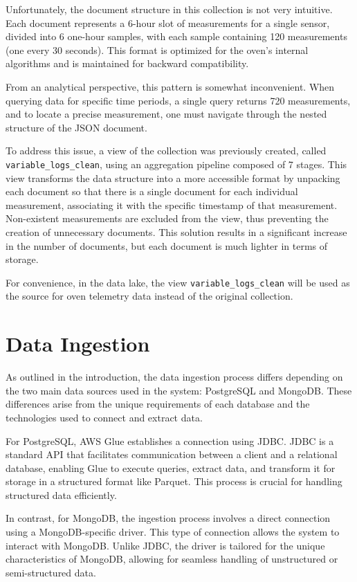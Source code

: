 Unfortunately, the document structure in this collection is not very intuitive. Each document represents a 6-hour slot of measurements for a single sensor, divided into 6 one-hour samples, with each sample containing 120 measurements (one every 30 seconds). This format is optimized for the oven’s internal algorithms and is maintained for backward compatibility.

From an analytical perspective, this pattern is somewhat inconvenient. When querying data for specific time periods, a single query returns 720 measurements, and to locate a precise measurement, one must navigate through the nested structure of the \ac{JSON} document.

To address this issue, a view of the collection was previously created, called \texttt{variable\_logs\_clean}, using an aggregation pipeline composed of 7 stages. This view transforms the data structure into a more accessible format by unpacking each document so that there is a single document for each individual measurement, associating it with the specific timestamp of that measurement. Non-existent measurements are excluded from the view, thus preventing the creation of unnecessary documents. This solution results in a significant increase in the number of documents, but each document is much lighter in terms of storage.

For convenience, in the data lake, the view \texttt{variable\_logs\_clean} will be used as the source for oven telemetry data instead of the original collection.

\section{Data Ingestion}
As outlined in the introduction, the data ingestion process differs depending on the two main data sources used in the system: PostgreSQL and MongoDB. These differences arise from the unique requirements of each database and the technologies used to connect and extract data.

For PostgreSQL, AWS Glue establishes a connection using \ac{JDBC}. \ac{JDBC} is a standard API that facilitates communication between a client and a relational database, enabling Glue to execute queries, extract data, and transform it for storage in a structured format like Parquet. This process is crucial for handling structured data efficiently.

In contrast, for MongoDB, the ingestion process involves a direct connection using a MongoDB-specific driver. This type of connection allows the system to interact with MongoDB. Unlike \ac{JDBC}, the driver is tailored for the unique characteristics of MongoDB, allowing for seamless handling of unstructured or semi-structured data.

